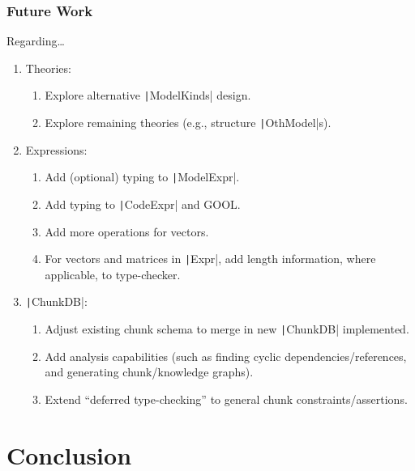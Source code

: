 \documentclass[xcolor={dvipsnames}]{beamer}
\newcommand{\inlineHs}[1]{\texttt|#1|}
\begin{document}
\begin{frame}
  \frametitle{Future Work}

  Regarding\ldots{}
  \begin{enumerate}
    \item Theories:
      \begin{enumerate}
        \item Explore alternative \inlineHs{ModelKinds} design.
        \item Explore remaining theories (e.g., structure \inlineHs{OthModel}s).
      \end{enumerate}
    \item Expressions:
      \begin{enumerate}
        \item Add (optional) typing to \inlineHs{ModelExpr}.
        \item Add typing to \inlineHs{CodeExpr} and GOOL.
        \item Add more operations for vectors.
        \item For vectors and matrices in \inlineHs{Expr}, add length
              information, where applicable, to type-checker.
      \end{enumerate}
    \item \inlineHs{ChunkDB}:
      \begin{enumerate}
        \item Adjust existing chunk schema to merge in new \inlineHs{ChunkDB}
              implemented.
        \item Add analysis capabilities (such as finding cyclic
              dependencies/references, and generating chunk/knowledge graphs).
        \item Extend ``deferred type-checking'' to general chunk
              constraints/assertions.
      \end{enumerate}
  \end{enumerate}

\end{frame}

\section{Conclusion}
\end{document}
